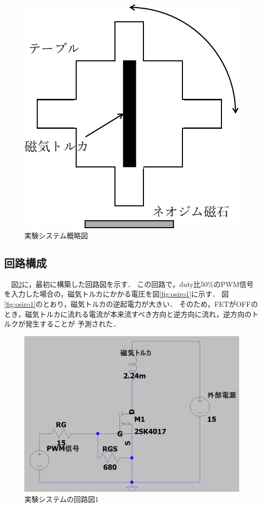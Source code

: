 \begin{figure}[H]
	\centering
		\includegraphics[scale=0.5]{./figure/system-crop.pdf}
		\caption{実験システム概略図}
		\label{fig:systemfig}
\end{figure}

\subsection{回路構成}
　図\ref{fig:cirkit1}に，最初に構築した回路図を示す．
この回路で，duty比50\%のPWM信号を入力した場合の，磁気トルカにかかる電圧を図\ref{fig:osiro1}に示す．
図\ref{fig:osiro1}のとおり，磁気トルカの逆起電力が大きい．
そのため，FETがOFFのとき，磁気トルカに流れる電流が本来流すべき方向と逆方向に流れ，逆方向のトルクが発生することが
予測された．

\begin{figure}[H]
	\centering
		\includegraphics[scale=0.3]{./figure/回路図1.png}
		\caption{実験システムの回路図1}
		\label{fig:cirkit1}
\end{figure}

